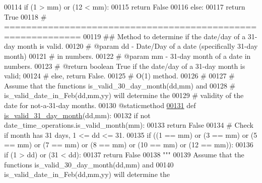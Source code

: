 \begin{DoxyCode}
00114         \textcolor{keywordflow}{if} (1 > mm) \textcolor{keywordflow}{or} (12 < mm):
00115             \textcolor{keywordflow}{return} \textcolor{keyword}{False}
00116         \textcolor{keywordflow}{else}:
00117             \textcolor{keywordflow}{return} \textcolor{keyword}{True}
00118     \textcolor{comment}{# ============================================================}
00119     \textcolor{comment}{##  Method to determine if the date/day of a 31-day month is valid.}
00120     \textcolor{comment}{#   @param dd - Date/Day of a date (specifically 31-day month)}
00121     \textcolor{comment}{#                   in numbers.}
00122     \textcolor{comment}{#   @param mm - 31-day month of a date in numbers.}
00123     \textcolor{comment}{#   @return boolean True if the date/day of a 31-day month is valid;}
00124     \textcolor{comment}{#       else, return False.}
00125     \textcolor{comment}{#   O(1) method.}
00126     \textcolor{comment}{#}
00127     \textcolor{comment}{#   Assume that the functions is\_valid\_30\_day\_month(dd,mm) and}
00128     \textcolor{comment}{#       is\_valid\_date\_in\_Feb(dd,mm,yy) will determine the}
00129     \textcolor{comment}{#       validity of the date for not-a-31-day months.}
00130     @staticmethod
\hypertarget{date__time__processing_8py_source_l00131}{}\hyperlink{classutilities_1_1date__time__processing_1_1date__time__operations_a4cef78f32520246407763e39a5b090ab}{00131}     \textcolor{keyword}{def }\hyperlink{classutilities_1_1date__time__processing_1_1date__time__operations_a4cef78f32520246407763e39a5b090ab}{is\_valid\_31\_day\_month}(dd,mm):
00132         \textcolor{keywordflow}{if} \textcolor{keywordflow}{not} date\_time\_operations.is\_valid\_month(mm):
00133             \textcolor{keywordflow}{return} \textcolor{keyword}{False}
00134         \textcolor{comment}{# Check if month has 31 days, 1 <= dd <= 31.}
00135         \textcolor{keywordflow}{if} ((1 == mm) \textcolor{keywordflow}{or} (3 == mm) \textcolor{keywordflow}{or} (5 == mm) \textcolor{keywordflow}{or} (7 == mm) \textcolor{keywordflow}{or} (8 == mm) \textcolor{keywordflow}{or} (10 == mm) \textcolor{keywordflow}{or} (12 == mm)):
00136             \textcolor{keywordflow}{if} (1 > dd) \textcolor{keywordflow}{or} (31 < dd):
00137                 \textcolor{keywordflow}{return} \textcolor{keyword}{False}
00138         \textcolor{stringliteral}{"""}
00139 \textcolor{stringliteral}{            Assume that the functions is\_valid\_30\_day\_month(dd,mm) and}
00140 \textcolor{stringliteral}{                is\_valid\_date\_in\_Feb(dd,mm,yy) will determine the}

\end{DoxyCode}
